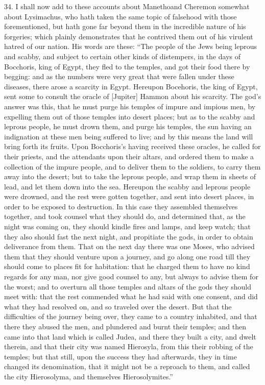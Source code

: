 34. I shall now add to these accounts about Manethoand Cheremon somewhat
about Lysimachus, who hath taken the same topic of falsehood with those
forementioned, but hath gone far beyond them in the incredible nature of
his forgeries; which plainly demonstrates that he contrived them out of
his virulent hatred of our nation. His words are these: ``The people of the
Jews being leprous and scabby, and subject to certain other kinds of
distempers, in the days of Bocchoris, king of Egypt, they fled to the
temples, and got their food there by begging: and as the numbers were very
great that were fallen under these diseases, there arose a scarcity in
Egypt. Hereupon Bocehoris, the king of Egypt, sent some to consult the
oracle of [Jupiter] Hammon about his scarcity. The god's answer was this,
that he must purge his temples of impure and impious men, by expelling
them out of those temples into desert places; but as to the scabby and
leprous people, he must drown them, and purge his temples, the sun having
an indignation at these men being suffered to live; and by this means the
land will bring forth its fruits. Upon Bocchoris's having received these
oracles, he called for their priests, and the attendants upon their
altars, and ordered them to make a collection of the impure people, and to
deliver them to the soldiers, to carry them away into the desert; but to
take the leprous people, and wrap them in sheets of lead, and let them
down into the sea. Hereupon the scabby and leprous people were drowned,
and the rest were gotten together, and sent into desert places, in order
to be exposed to destruction. In this case they assembled themselves
together, and took counsel what they should do, and determined that, as
the night was coming on, they should kindle fires and lamps, and keep
watch; that they also should fast the next night, and propitiate the gods,
in order to obtain deliverance from them. That on the next day there was
one Moses, who advised them that they should venture upon a journey, and
go along one road till they should come to places fit for habitation: that
he charged them to have no kind regards for any man, nor give good counsel
to any, but always to advise them for the worst; and to overturn all those
temples and altars of the gods they should meet with: that the rest
commended what he had said with one consent, and did what they had
resolved on, and so traveled over the desert. But that the difficulties of
the journey being over, they came to a country inhabited, and that there
they abused the men, and plundered and burnt their temples; and then came
into that land which is called Judea, and there they built a city, and
dwelt therein, and that their city was named Hierosyla, from this their
robbing of the temples; but that still, upon the success they had
afterwards, they in time changed its denomination, that it might not be a
reproach to them, and called the city Hierosolyma, and themselves
Hierosolymites.''

